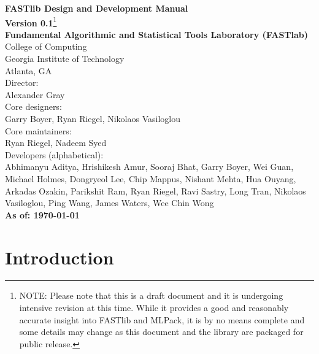\documentclass[letter]{report}
\begin{document}
\begin{titlepage}
\begin{center}
\large {\bf
FASTlib Design and Development Manual\\
\normalsize Version 0.1}\footnote{
NOTE: Please note that this is a draft document and it is undergoing intensive revision at this time. While it provides a good and reasonably accurate insight into FASTlib and MLPack, it is by no means complete and some details may change as this document and the library are packaged for public release.
}\\ 
\vspace{.1in}
\large {\bf Fundamental Algorithmic and Statistical Tools Laboratory (FASTlab)}\\
College of Computing\\
Georgia Institute of Technology\\
Atlanta, GA\\
\vspace{.1in}
Director:\\
Alexander Gray\\
\vspace{.1in}
Core designers:\\
Garry Boyer, Ryan Riegel, Nikolaos Vasiloglou\\
\vspace{.1in}
Core maintainers:\\
Ryan Riegel, Nadeem Syed\\
\vspace{.1in}
Developers (alphabetical):\\
Abhimanyu Aditya, 
Hrishikesh Amur, 
Sooraj Bhat, 
Garry Boyer, 
Wei Guan, 
Michael Holmes, 
Dongryeol Lee,
Chip Mappus, 
Nishant Mehta, 
Hua Ouyang, 
Arkadas Ozakin, 
Parikshit Ram, 
Ryan Riegel, 
Ravi Sastry,
Long Tran, 
Nikolaos Vasiloglou, 
Ping Wang, 
James Waters, 
Wee Chin Wong\\
\vspace{.1in}
{\bf As of: \today}
\end{center}

\end{titlepage}

\tableofcontents

\chapter {Introduction}
\end{document}
